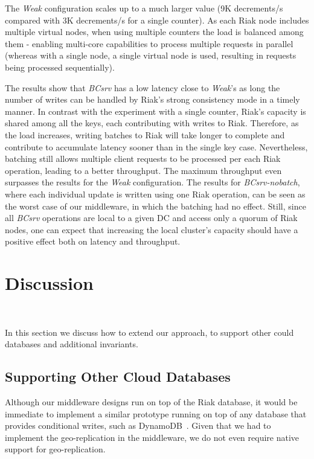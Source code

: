 \documentclass[conference]{IEEEtran}
\begin{document}
The \emph{Weak} configuration scales up to a much larger value (9K decrements/s 
compared with 3K decrements/s for a single counter).
As each Riak node includes multiple virtual nodes, when using multiple counters
the load is balanced among them - enabling multi-core 
capabilities to process multiple requests in parallel (whereas with a single node, a single virtual node is used, resulting in  
requests being processed sequentially).




The results show that \emph{BCsrv} has a low latency close to \emph{Weak}'s
as long the number of writes can be handled by Riak's
strong consistency mode in a timely manner. 
In contrast with the experiment with a single counter, Riak's capacity is shared among all the keys, each contributing with writes to Riak.
Therefore, as the load increases, writing batches to Riak will take longer to complete and contribute to accumulate latency sooner than in the single key case.
Nevertheless, batching still allows multiple client requests to be processed per each Riak operation, leading to a better throughput.
The maximum throughput even surpasses the results for the \emph{Weak} configuration.
The results for \emph{BCsrv-nobatch}, where each individual update is written 
using one Riak operation, can be seen as the worst case of our middleware, 
in which the batching had no effect. Still, since all \emph{BCsrv} operations are local to a given DC and access only a quorum of Riak nodes, one
can expect that increasing the local cluster's capacity should have a positive effect both on latency and throughput.









\section{Discussion}~\label{sec:extension}

In this section we discuss how to extend our approach,
to support other could databases and additional invariants.

\subsection{Supporting Other Cloud Databases}

Although our middleware designs run on top
of the Riak database, it would be immediate to implement a similar
prototype running on top of any database that 
provides conditional writes, such as DynamoDB~\cite{dynamo}. 
Given that we had to implement the geo-replication in the middleware, we do 
not even require native support for geo-replication.
\end{document}
